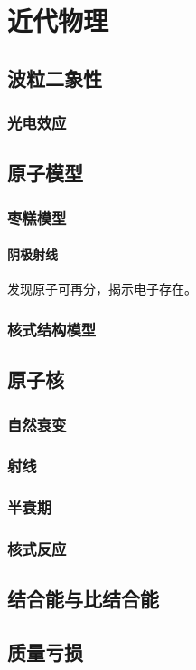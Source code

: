 \section{近代物理}
\subsection{波粒二象性}
\subsubsection{光电效应}
\subsection{原子模型}
\subsubsection{枣糕模型}
\paragraph{阴极射线} 发现原子可再分，揭示电子存在。
\subsubsection{核式结构模型}
\subsection{原子核}
\subsubsection{自然衰变}
\subsubsection{射线}
\subsubsection{半衰期}
\subsubsection{核式反应}
\subsection{结合能与比结合能}
\subsection{质量亏损}
